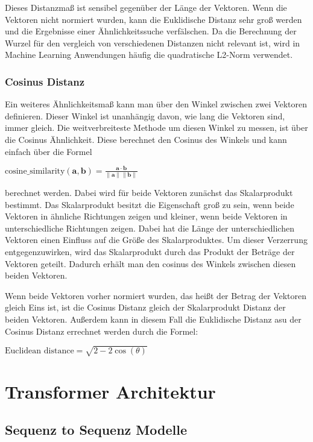 Dieses Distanzmaß ist sensibel gegenüber der Länge der Vektoren.
Wenn die Vektoren nicht normiert wurden, kann die Euklidische Distanz sehr groß werden und die Ergebnisse einer Ähnlichkeitssuche verfälschen.
Da die Berechnung der Wurzel für den vergleich von verschiedenen Distanzen nicht relevant ist, wird in Machine Learning Anwendungen häufig die quadratische L2-Norm verwendet.

\subsubsection{Cosinus Distanz}

Ein weiteres Ähnlichkeitsmaß kann man über den Winkel zwischen zwei Vektoren definieren.
Dieser Winkel ist unanhängig davon, wie lang die Vektoren sind, immer gleich.
Die weitverbreiteste Methode um diesen Winkel zu messen, ist über die Cosinus Ähnlichkeit.
Diese berechnet den Cosinus des Winkels und kann einfach über die Formel

$\text{cosine\_similarity}(\mathbf{a}, \mathbf{b}) = \frac{\mathbf{a} \cdot \mathbf{b}}{\|\mathbf{a}\| \|\mathbf{b}\|}$

berechnet werden.
Dabei wird für beide Vektoren zunächst das Skalarprodukt bestimmt.
Das Skalarprodukt besitzt die Eigenschaft groß zu sein, wenn beide Vektoren in ähnliche Richtungen zeigen und kleiner, wenn beide Vektoren in unterschiedliche Richtungen zeigen.
Dabei hat die Länge der unterschiedlichen Vektoren einen Einfluss auf die Größe des Skalarproduktes.
Um dieser Verzerrung entgegenzuwirken, wird das Skalarprodukt durch das Produkt der Beträge der Vektoren geteilt.
Dadurch erhält man den cosinus des Winkels zwischen diesen beiden Vektoren.

Wenn beide Vektoren vorher normiert wurden, das heißt der Betrag der Vektoren gleich Eins ist, ist die Cosinus Distanz gleich der Skalarprodukt Distanz der beiden Vektoren.
Außerdem kann in diesem Fall die Euklidische Distanz asu der Cosinus Distanz errechnet werden durch die Formel: 

$\text{Euclidean distance} = \sqrt{2 - 2 \cos(\theta)}$

\section{Transformer Architektur}

\subsection{Sequenz to Sequenz Modelle}

